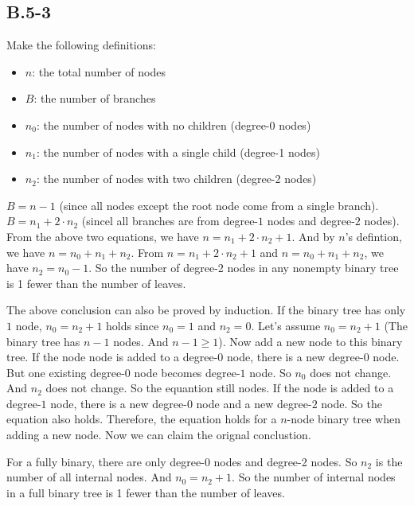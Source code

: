 \documentclass{book}
\begin{document}
\begin{CJK}{UTF8}{gkai}
\subsection*{B.5-3}
Make the following definitions:
\begin{itemize}
  \item$n$: the total number of nodes
  \item$B$: the number of branches
  \item$n_{0}$: the number of nodes with no children (degree-0 nodes)
  \item$n_{1}$: the number of nodes with a single child (degree-1 nodes)
  \item$n_{2}$: the number of nodes with two children (degree-2 nodes)
\end{itemize}
$B = n -1 $ (since all nodes except the root node come from a single branch).  
$B = n_{1} + 2\cdot n_{2}$ (sincel all branches are from degree-$1$ nodes and 
degree-$2$ nodes). From the above two equations, we have $n = n_{1} + 2\cdot 
n_{2} + 1$. And by $n$'s defintion, we have $n = n_{0} + n_{1} + n_{2}$. From $n 
= n_{1} + 2 \cdot n_{2} + 1$ and $n = n_{0} + n_{1} + n_{2}$, we have $n_{2} = 
n_{0} - 1$.  So the number of degree-2 nodes in any nonempty binary tree is 1 
fewer than the number of leaves.

The above conclusion can also be proved by induction. If the binary tree has 
only $1$ node, $n_{0} = n_{2} + 1$ holds since $n_{0} = 1$ and $n_{2} = 0$.  
Let's assume $n_{0} = n_{2} + 1$ (The binary tree has $n-1$ nodes. And $n-1 \geq 
1$). Now add a new node to this binary tree. If the node node is added to a 
degree-$0$ node, there is a new degree-{0} node. But one existing degree-$0$ 
node becomes degree-$1$ node.  So $n_{0}$ does not change. And $n_{2}$ does not 
change. So the equantion still nodes. If the node is added to a degree-$1$ node, 
there is a new degree-$0$ node and a new degree-$2$ node. So the equation also 
holds. Therefore, the equation holds for a $n$-node binary tree when adding a 
new node. Now we can claim the orignal conclustion.

For a fully binary, there are only degree-0 nodes and degree-2 nodes. So $n_2$ 
is the number of all internal nodes. And $n_{0} = n_{2} + 1$. So the number of 
internal nodes in a full binary tree is 1 fewer than the number of leaves.

\end{CJK}
\end{document}
